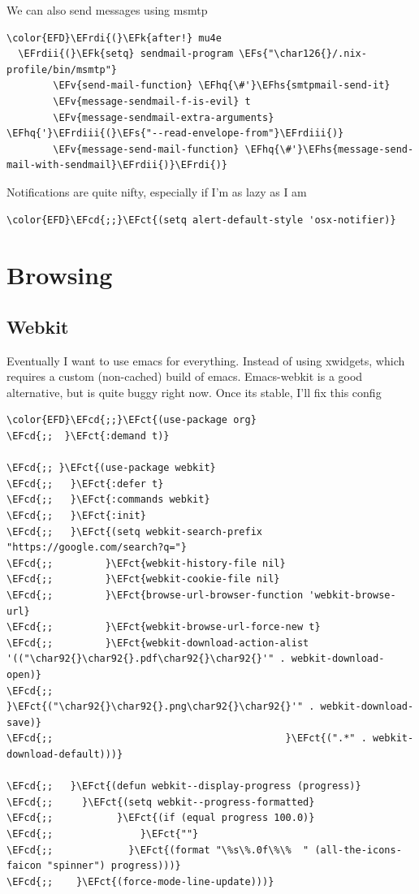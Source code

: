 \documentclass{scrartcl}
\newcommand{\EFk}[1]{\textcolor{EFk}{#1}} %
\newcommand{\EFs}[1]{\textcolor{EFs}{#1}} %
\newcommand{\EFct}[1]{\textcolor{EFct}{#1}} %
\newcommand{\EFv}[1]{\textcolor{EFv}{#1}} %
\newcommand{\EFcd}[1]{\textcolor{EFcd}{#1}} %
\newcommand{\EFhq}[1]{\textcolor{EFhq}{#1}} %
\newcommand{\EFhs}[1]{\textcolor{EFhs}{#1}} %
\newcommand{\EFrdi}[1]{\textcolor{EFrdi}{#1}} %
\newcommand{\EFrdii}[1]{\textcolor{EFrdii}{#1}} %
\newcommand{\EFrdiii}[1]{\textcolor{EFrdiii}{#1}} %
\begin{document}
We can also send messages using msmtp
\begin{Code}
\begin{Verbatim}[]
\color{EFD}\EFrdi{(}\EFk{after!} mu4e
  \EFrdii{(}\EFk{setq} sendmail-program \EFs{"\char126{}/.nix-profile/bin/msmtp"}
        \EFv{send-mail-function} \EFhq{\#'}\EFhs{smtpmail-send-it}
        \EFv{message-sendmail-f-is-evil} t
        \EFv{message-sendmail-extra-arguments} \EFhq{'}\EFrdiii{(}\EFs{"--read-envelope-from"}\EFrdiii{)}
        \EFv{message-send-mail-function} \EFhq{\#'}\EFhs{message-send-mail-with-sendmail}\EFrdii{)}\EFrdi{)}
\end{Verbatim}
\end{Code}

Notifications are quite nifty, especially if I'm as lazy as I am
\begin{Code}
\begin{Verbatim}[]
\color{EFD}\EFcd{;;}\EFct{(setq alert-default-style 'osx-notifier)}
\end{Verbatim}
\end{Code}

\section{Browsing}
\label{sec:orgd91aa7a}
\subsection{Webkit}
\label{sec:org7938c46}
Eventually I want to use emacs for everything. Instead of using xwidgets, which
requires a custom (non-cached) build of emacs. Emacs-webkit is a good
alternative, but is quite buggy right now. Once its stable, I'll fix this config
\begin{Code}
\begin{Verbatim}[]
\color{EFD}\EFcd{;;}\EFct{(use-package org}
\EFcd{;;  }\EFct{:demand t)}

\EFcd{;; }\EFct{(use-package webkit}
\EFcd{;;   }\EFct{:defer t}
\EFcd{;;   }\EFct{:commands webkit}
\EFcd{;;   }\EFct{:init}
\EFcd{;;   }\EFct{(setq webkit-search-prefix "https://google.com/search?q="}
\EFcd{;;         }\EFct{webkit-history-file nil}
\EFcd{;;         }\EFct{webkit-cookie-file nil}
\EFcd{;;         }\EFct{browse-url-browser-function 'webkit-browse-url}
\EFcd{;;         }\EFct{webkit-browse-url-force-new t}
\EFcd{;;         }\EFct{webkit-download-action-alist '(("\char92{}\char92{}.pdf\char92{}\char92{}'" . webkit-download-open)}
\EFcd{;;                                        }\EFct{("\char92{}\char92{}.png\char92{}\char92{}'" . webkit-download-save)}
\EFcd{;;                                        }\EFct{(".*" . webkit-download-default)))}

\EFcd{;;   }\EFct{(defun webkit--display-progress (progress)}
\EFcd{;;     }\EFct{(setq webkit--progress-formatted}
\EFcd{;;           }\EFct{(if (equal progress 100.0)}
\EFcd{;;               }\EFct{""}
\EFcd{;;             }\EFct{(format "\%s\%.0f\%\%  " (all-the-icons-faicon "spinner") progress)))}
\EFcd{;;    }\EFct{(force-mode-line-update)))}
\end{Verbatim}
\end{Code}
\end{document}
